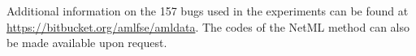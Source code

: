 
\vspace{0.2cm} Additional information on the 157 bugs used in the experiments can be found at \url{https://bitbucket.org/amlfse/amldata}. The codes of the NetML method can also be made available upon request.

